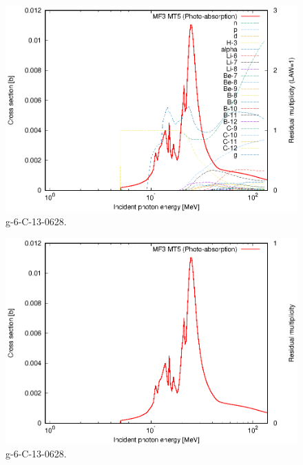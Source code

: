 \begin{figure}
 \includegraphics[width=\linewidth]{eps/g_6-C-13_0628.eps}
  \caption{g-6-C-13-0628.}
\end{figure}
\begin{figure}
 \includegraphics[width=\linewidth]{eps-law0/g_6-C-13_0628.eps}
 \caption{g-6-C-13-0628.}
\end{figure}
\newpage \clearpage

